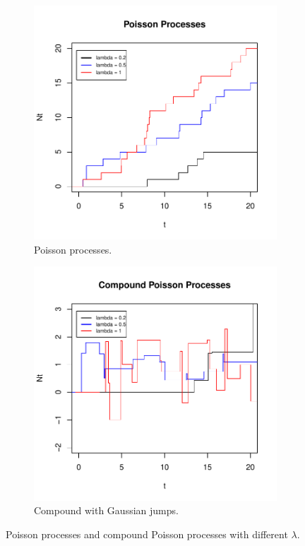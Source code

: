 \begin{figure}
	\centering
	\begin{subfigure}{.5\textwidth}
		\centering
		\includegraphics[width=\linewidth]{Images/poisson_process.pdf}
		\caption{Poisson processes.}
		\label{fig:pois}
	\end{subfigure}%
	\begin{subfigure}{.5\textwidth}
		\centering
		\includegraphics[width=\linewidth]{Images/compound_poisson_process.pdf}
		\caption{Compound with Gaussian jumps.}
		\label{fig:compound_pois}
	\end{subfigure}
	\caption{Poisson processes and compound Poisson processes with different $\lambda$.}
	\label{fig:pois_process}
\end{figure}

